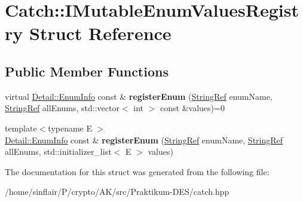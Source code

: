 \hypertarget{structCatch_1_1IMutableEnumValuesRegistry}{}\section{Catch\+:\+:I\+Mutable\+Enum\+Values\+Registry Struct Reference}
\label{structCatch_1_1IMutableEnumValuesRegistry}
\subsection*{Public Member Functions}
\begin{DoxyCompactItemize}
\item 
\mbox{\label{structCatch_1_1IMutableEnumValuesRegistry_a948e66e85f5b66ab68256d50bfe548f4}} 
virtual \hyperlink{structCatch_1_1Detail_1_1EnumInfo}{Detail\+::\+Enum\+Info} const  \& {\bfseries register\+Enum} (\hyperlink{classCatch_1_1StringRef}{String\+Ref} enum\+Name, \hyperlink{classCatch_1_1StringRef}{String\+Ref} all\+Enums, std\+::vector$<$ int $>$ const \&values)=0
\item 
\mbox{\label{structCatch_1_1IMutableEnumValuesRegistry_a60e4546c6fd45f9be68e43410403b562}} 
{\footnotesize template$<$typename E $>$ }\\\hyperlink{structCatch_1_1Detail_1_1EnumInfo}{Detail\+::\+Enum\+Info} const  \& {\bfseries register\+Enum} (\hyperlink{classCatch_1_1StringRef}{String\+Ref} enum\+Name, \hyperlink{classCatch_1_1StringRef}{String\+Ref} all\+Enums, std\+::initializer\+\_\+list$<$ E $>$ values)
\end{DoxyCompactItemize}


The documentation for this struct was generated from the following file\+:\begin{DoxyCompactItemize}
\item 
/home/sinflair/\+P/crypto/\+A\+K/src/\+Praktikum-\/\+D\+E\+S/catch.\+hpp\end{DoxyCompactItemize}
